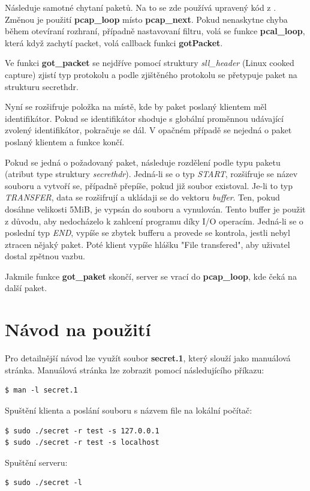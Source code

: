 \documentclass[11pt, a4paper]{article}
\begin{document}
Následuje samotné chytaní paketů. Na to se zde používá upravený kód z \cite{Tcpdump}. Změnou je použití \textbf{pcap\_loop} místo \textbf{pcap\_next}. Pokud nenaskytne chyba během otevíraní rozhraní, případně nastavovaní filtru, volá se funkce \textbf{pcal\_loop}, která když zachytí packet, volá callback funkci \textbf{gotPacket}.

Ve funkci \textbf{got\_packet} se nejdříve pomocí struktury \emph{sll\_header} (Linux cooked capture) zjistí typ protokolu a podle zjištěného protokolu se přetypuje paket na strukturu secrethdr.

Nyní se rozšifruje položka na místě, kde by paket poslaný klientem měl identifikátor. Pokud se identifikátor shoduje s globální proměnnou udávající zvolený identifikátor, pokračuje se dál. V opačném případě se nejedná o paket poslaný klientem a funkce končí.

Pokud se jedná o požadovaný paket, následuje rozdělení podle typu paketu (atribut type struktury \emph{secrethdr}). Jedná-li se o typ \emph{START}, rozšifruje se název souboru a vytvoří se, případně přepíše, pokud již soubor existoval. Je-li to typ \emph{TRANSFER}, data se rozšifrují a ukládaji se do vektoru \emph{buffer}. Ten, pokud dosáhne velikosti 5MiB, je vypsán do souboru a vynulován. Tento buffer je použit z důvodu, aby nedocházelo k zahlcení programu díky I/O operacím. Jedná-li se o poslední typ \emph{END}, vypíše se zbytek bufferu a provede se kontrola, jestli nebyl ztracen nějaký paket. Poté klient vypíše hlášku "File transfered", aby uživatel dostal zpětnou vazbu.

Jakmile funkce \textbf{got\_paket} skončí, server se vrací do \textbf{pcap\_loop}, kde čeká na další paket.

\section{Návod na použití}
Pro detailnější návod lze využít soubor \textbf{secret.1}, který slouží jako manuálová stránka. Manuálová stránka lze zobrazit pomocí následujícího příkazu: 

\begin{verbatim}
$ man -l secret.1 
\end{verbatim}

\begin{flushleft}

Spuštění klienta a poslání souboru s názvem file na lokální počítač:
\begin{verbatim}
$ sudo ./secret -r test -s 127.0.0.1
$ sudo ./secret -r test -s localhost
\end{verbatim}

Spuštění serveru:

\begin{verbatim}
$ sudo ./secret -l
\end{verbatim}

\end{flushleft}
\end{document}
